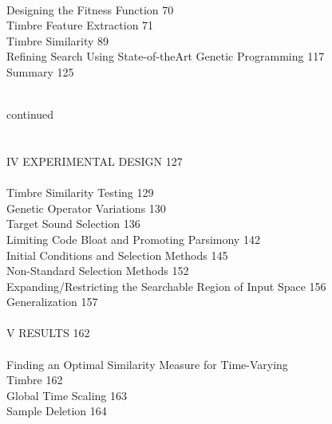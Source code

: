 \documentclass[12pt]{report} 	%
\numberwithin{figure}{chapter}
\numberwithin{table}{chapter}
\numberwithin{equation}{chapter}
\begin{document}
\\
\indent \indent \indent \indent Designing the Fitness Function \hfill 70
\\
\indent \indent \indent \indent \indent Timbre Feature Extraction \hfill 71
\\
\indent \indent \indent \indent \indent Timbre Similarity \hfill 89
\\
\indent \indent \indent \indent Refining Search Using State-of-theArt Genetic Programming \hfill 117
\\
\indent \indent \indent \indent Summary \hfill 125
\\
\\
\strut\hfill continued
\\
\\
\\
\indent \indent IV \hspace{6pt}  EXPERIMENTAL DESIGN \hfill 127
\\
\\
\indent \indent \indent \indent Timbre Similarity Testing \hfill 129
\\
\indent \indent \indent \indent Genetic Operator Variations \hfill 130
\\
\indent \indent \indent \indent Target Sound Selection \hfill 136
\\
\indent \indent \indent \indent Limiting Code Bloat and Promoting Parsimony \hfill 142
\\
\indent \indent \indent \indent Initial Conditions and Selection Methods \hfill 145
\\
\indent \indent \indent \indent \indent Non-Standard Selection Methods \hfill 152
\\
\indent \indent \indent \indent Expanding/Restricting the Searchable Region of Input Space \hfill 156
\\
\indent \indent \indent \indent Generalization \hfill 157
\\
\\
\indent \indent V \hspace{10pt}  RESULTS \hfill 162
\\
\\
\indent \indent \indent \indent Finding an Optimal Similarity Measure for Time-Varying 
\\ 
\indent \indent \indent \indent \indent Timbre \hfill 162
\\
\indent \indent \indent \indent \indent Global Time Scaling \hfill 163
\\
\indent \indent \indent \indent \indent Sample Deletion \hfill 164
\end{document}
